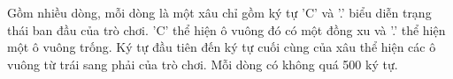 Gồm nhiều dòng, mỗi dòng là một xâu chỉ gồm ký tự 'C' và '.' biểu diễn trạng thái ban đầu của trò chơi. 'C' thể hiện ô vuông đó có một đồng xu và '.' thể hiện một ô vuông trống. Ký tự đầu tiên đến ký tự cuối cùng của xâu thể hiện các ô vuông từ trái sang phải của trò chơi. Mỗi dòng có không quá 500 ký tự.